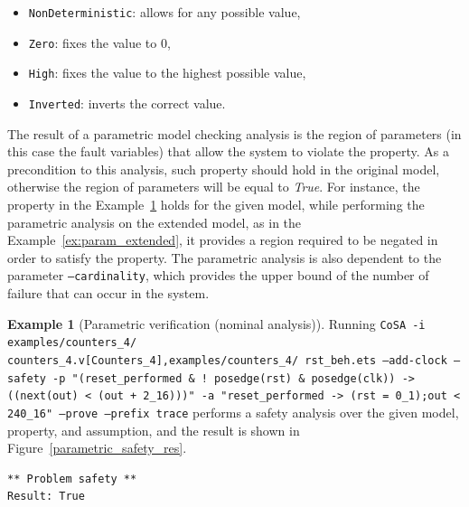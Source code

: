\documentclass{article}
\theoremstyle{definition}
\newtheorem{example}{Example}[section]
\begin{document}
\begin{itemize}
\item \texttt{NonDeterministic}: allows for any possible value,
\item \texttt{Zero}: fixes the value to 0,
\item \texttt{High}: fixes the value to the highest possible value,
\item \texttt{Inverted}: inverts the correct value.
\end{itemize}

The result of a parametric model checking analysis is the region of
parameters (in this case the fault variables) that allow the system to
violate the property. As a precondition to this analysis, such
property should hold in the original model, otherwise the region of
parameters will be equal to \emph{True}. For instance, the property in
the Example~\ref{ex:param_nominal} holds for the given model, while
performing the parametric analysis on the extended model, as in the
Example~\ref{ex:param_extended}, it provides a region required to be
negated in order to satisfy the property. The parametric analysis is
also dependent to the parameter \texttt{--cardinality}, which provides
the upper bound of the number of failure that can occur in the system.

\begin{example}[Parametric verification (nominal analysis)]
  \label{ex:param_nominal}
  Running \texttt{CoSA -i
    examples/counters\_4/\\counters\_4.v[Counters\_4],examples/counters\_4/
    rst\_beh.ets --add-clock --safety -p "(reset\_performed \& !
    posedge(rst) \& posedge(clk)) -> ((next(out) < (out + 2\_16)))" -a
    "reset\_performed -> (rst = 0\_1);out < 240\_16" --prove --prefix
    trace} performs a safety analysis over the given model, property,
  and assumption, and the result is shown in
  Figure~\ref{parametric_safety_res}.

\begin{lstlisting}[frame=single,language=ets,caption=Safety analysis example,label=parametric_safety_res]
** Problem safety **
Result: True
\end{lstlisting}

\end{example}
\end{document}
